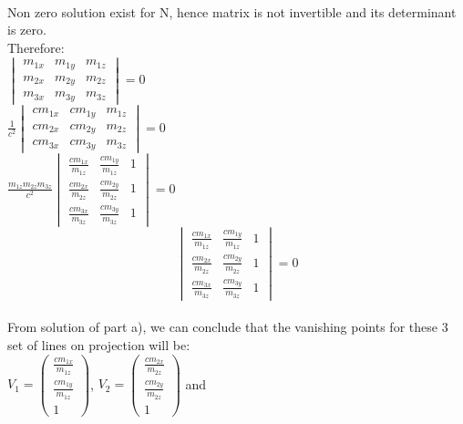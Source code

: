 \documentclass{article}
\begin{document}
	\\
	Non zero solution exist for N, hence matrix is not invertible and its determinant is zero.
	\\
	Therefore:
	\\
	\begin{math}\begin{vmatrix}m_{1x}&m_{1y}&m_{1z}\\m_{2x}&m_{2y}&m_{2z}\\m_{3x}&m_{3y}&m_{3z}\end{vmatrix} = 0 \end{math}
	\\
	\begin{math}\frac{1}{c^2}\begin{vmatrix}cm_{1x}&cm_{1y}&m_{1z}\\cm_{2x}&cm_{2y}&m_{2z}\\cm_{3x}&cm_{3y}&m_{3z}\end{vmatrix} = 0 \end{math}
	\\
	\begin{math}\frac{m_{1z}m_{2z}m_{3z}}{c^2}\begin{vmatrix}\frac{cm_{1x}}{m_{1z}}&\frac{cm_{1y}}{m_{1z}}&1\\\frac{cm_{2x}}{m_{2z}}&\frac{cm_{2y}}{m_{2z}}&1\\\frac{cm_{3x}}{m_{3z}}&\frac{cm_{3y}}{m_{3z}}&1\end{vmatrix} = 0 \end{math}
	\\
	\begin{equation}
	\begin{vmatrix}\frac{cm_{1x}}{m_{1z}}&\frac{cm_{1y}}{m_{1z}}&1\\\frac{cm_{2x}}{m_{2z}}&\frac{cm_{2y}}{m_{2z}}&1\\\frac{cm_{3x}}{m_{3z}}&\frac{cm_{3y}}{m_{3z}}&1\end{vmatrix} = 0 
	\end{equation}
	\\
	From solution of part a), we can conclude that the vanishing points for these 3 set of lines on projection will be:
	\\
	\begin{math}V_1=\begin{pmatrix}\frac{cm_{1x}}{m_{1z}}\\\frac{cm_{1y}}{m_{1z}}\\1\end{pmatrix}\end{math}, 
	\begin{math}V_2=\begin{pmatrix}\frac{cm_{2x}}{m_{2z}}\\\frac{cm_{2y}}{m_{2z}}\\1\end{pmatrix}\end{math} and 
\end{document}
